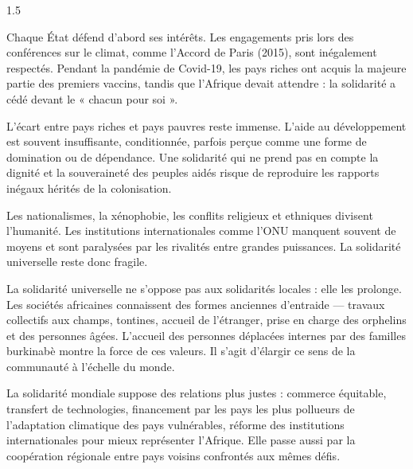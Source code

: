 \documentclass[12pt]{article}
\begin{document}
\begin{spacing}{1.5}


Chaque État défend d'abord ses intérêts. Les engagements pris lors des conférences sur le climat, comme l'Accord de Paris (2015), sont inégalement respectés. Pendant la pandémie de Covid-19, les pays riches ont acquis la majeure partie des premiers vaccins, tandis que l'Afrique devait attendre : la solidarité a cédé devant le « chacun pour soi ».

L'écart entre pays riches et pays pauvres reste immense. L'aide au développement est souvent insuffisante, conditionnée, parfois perçue comme une forme de domination ou de dépendance. Une solidarité qui ne prend pas en compte la dignité et la souveraineté des peuples aidés risque de reproduire les rapports inégaux hérités de la colonisation.

Les nationalismes, la xénophobie, les conflits religieux et ethniques divisent l'humanité. Les institutions internationales comme l'ONU manquent souvent de moyens et sont paralysées par les rivalités entre grandes puissances. La solidarité universelle reste donc fragile.



La solidarité universelle ne s'oppose pas aux solidarités locales : elle les prolonge. Les sociétés africaines connaissent des formes anciennes d'entraide — travaux collectifs aux champs, tontines, accueil de l'étranger, prise en charge des orphelins et des personnes âgées. L'accueil des personnes déplacées internes par des familles burkinabè montre la force de ces valeurs. Il s'agit d'élargir ce sens de la communauté à l'échelle du monde.

La solidarité mondiale suppose des relations plus justes : commerce équitable, transfert de technologies, financement par les pays les plus pollueurs de l'adaptation climatique des pays vulnérables, réforme des institutions internationales pour mieux représenter l'Afrique. Elle passe aussi par la coopération régionale entre pays voisins confrontés aux mêmes défis.


\end{spacing}
\end{document}

